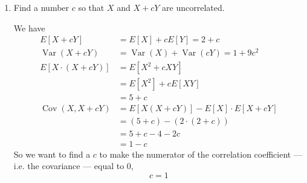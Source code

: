 \documentclass[10pt]{article}
\begin{document}
\begin{itemize}
\begin{enumerate}
       \item Find a number $c$ so that $X$ and $X+c Y$ are uncorrelated.

          We have
          \begin{align*}
             E[X+cY] &= E[X] + c E[Y] = 2 + c \\
             \operatorname{Var}(X+cY) &= \operatorname{Var}(X) + \operatorname{Var}(c Y) = 1 + 9c^2 \\
             E[X \cdot (X+cY)] &= E[X^2 + cXY] \\
                           &= E[X^2] + cE[XY] \\
                           &= 5+c\\
             \operatorname{Cov}(X,X+cY) &= E[X(X+cY)]-E[X]\cdot E[X+cY]\\
                           &= (5 + c) - (2 \cdot (2+c)) \\
                           &= 5 + c - 4 - 2c\\
                           &= 1-c
          \end{align*}
          So we want to find a $c$ to make the numerator of the 
          correlation coefficient --- i.e. the covariance --- equal to 0,
          \[ c=1 \]
          
     \end{enumerate}
\end{itemize}
\end{document}
